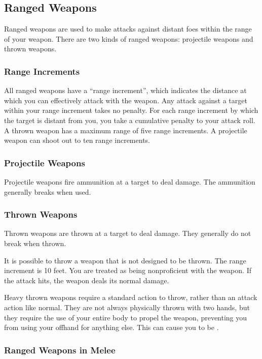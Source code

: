 \subsection{Ranged Weapons}
Ranged weapons are used to make attacks against distant foes within the range of your weapon. There are two kinds of ranged weapons: projectile weapons and thrown weapons.

\subsubsection{Range Increments}\label{Range Increment} All ranged weapons have a ``range increment'', which indicates the distance at which you can effectively attack with the weapon. Any attack against a target within your range increment takes no penalty. For each range increment by which the target is distant from you, you take a cumulative  penalty to your attack roll. A thrown weapon has a maximum range of five range increments. A projectile weapon can shoot out to ten range increments.

\subsubsection{Projectile Weapons} Projectile weapons fire ammunition at a target to deal damage. The ammunition generally breaks when used.

\subsubsection{Thrown Weapons}\label{Thrown Weapons} Thrown weapons are thrown at a target to deal damage. They generally do not break when thrown.

 It is possible to throw a weapon that is not designed to be thrown. The range increment is 10 feet. You are treated as being nonproficient with the weapon. If the attack hits, the weapon deals its normal damage.

 Heavy thrown weapons require a standard action to throw, rather than an attack action like normal. They are not always physically thrown with two hands, but they require the use of your entire body to propel the weapon, preventing you from using your offhand for anything else. This can cause you to be .

\subsubsection{Ranged Weapons in Melee}

